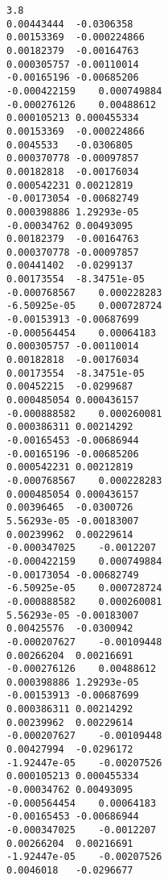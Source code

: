 \documentclass{article}
\begin{document}
\begin{verbatim}
3.8
0.00443444  -0.0306358
0.00153369  -0.000224866
0.00182379  -0.00164763
0.000305757 -0.00110014
-0.00165196 -0.00685206
-0.000422159    0.000749884
-0.000276126    0.00488612
0.000105213 0.000455334
0.00153369  -0.000224866
0.0045533   -0.0306805
0.000370778 -0.00097857
0.00182818  -0.00176034
0.000542231 0.00212819
-0.00173054 -0.00682749
0.000398886 1.29293e-05
-0.00034762 0.00493095
0.00182379  -0.00164763
0.000370778 -0.00097857
0.00441402  -0.0299137
0.00173554  -8.34751e-05
-0.000768567    0.000228283
-6.50925e-05    0.000728724
-0.00153913 -0.00687699
-0.000564454    0.00064183
0.000305757 -0.00110014
0.00182818  -0.00176034
0.00173554  -8.34751e-05
0.00452215  -0.0299687
0.000485054 0.000436157
-0.000888582    0.000260081
0.000386311 0.00214292
-0.00165453 -0.00686944
-0.00165196 -0.00685206
0.000542231 0.00212819
-0.000768567    0.000228283
0.000485054 0.000436157
0.00396465  -0.0300726
5.56293e-05 -0.00183007
0.00239962  0.00229614
-0.000347025    -0.0012207
-0.000422159    0.000749884
-0.00173054 -0.00682749
-6.50925e-05    0.000728724
-0.000888582    0.000260081
5.56293e-05 -0.00183007
0.00425576  -0.0300942
-0.000207627    -0.00109448
0.00266204  0.00216691
-0.000276126    0.00488612
0.000398886 1.29293e-05
-0.00153913 -0.00687699
0.000386311 0.00214292
0.00239962  0.00229614
-0.000207627    -0.00109448
0.00427994  -0.0296172
-1.92447e-05    -0.00207526
0.000105213 0.000455334
-0.00034762 0.00493095
-0.000564454    0.00064183
-0.00165453 -0.00686944
-0.000347025    -0.0012207
0.00266204  0.00216691
-1.92447e-05    -0.00207526
0.0046018   -0.0296677
\end{verbatim}
\end{document}
